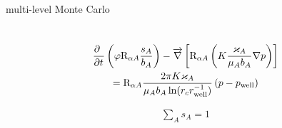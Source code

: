 \subsection{}

\subsubsection{}

multi-level Monte Carlo

\section{}

\begin{multline}
    \deriv{~}{t}\left(
        \varphi \matr{R}_{\alpha A} \frac{s_A}{b_A}
    \right) - \overrightarrow{\nabla} \left[
        \matr{R}_{\alpha A} \left(
            K\frac{\varkappa_A}{\mu_A b_A}\nabla p
        \right)
    \right] \\
    = \matr{R}_{\alpha A}
    \frac{2\pi K \varkappa_A}{\mu_A b_A \ln(r_c r_\text{well}^{-1})}
    \left(p - p_\text{well}\right)
\end{multline}

\begin{align}
    \sum_A s_A = 1
\end{align}
